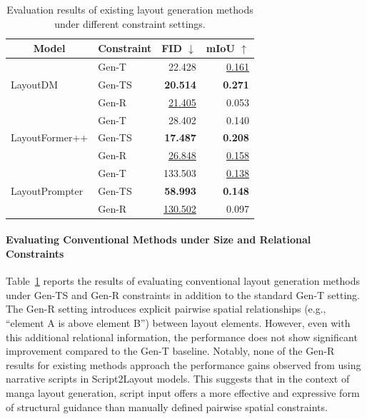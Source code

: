 \documentclass[sigconf, screen, review, anonymous]{acmart}
\begin{document}
\begin{table}[t]
\centering
\caption{
Evaluation results of existing layout generation methods under different constraint settings.
}
\begin{tabular}{l l r r}
\toprule
\multicolumn{1}{c}{Model} & \multicolumn{1}{c}{Constraint} & \multicolumn{1}{c}{FID $\downarrow$}& \multicolumn{1}{c}{mIoU $\uparrow$}\\
\midrule
\multirow{3}{*}{LayoutDM} 
    & Gen-T  &22.428 &  \underline{0.161} \\
    & Gen-TS & \textbf{20.514}    & \textbf{0.271} \\
    & Gen-R  &  \underline{21.405}             & 0.053 \\
\midrule
\multirow{3}{*}{LayoutFormer++} 
    & Gen-T  & 28.402             & 0.140 \\
    & Gen-TS & \textbf{17.487}    & \textbf{0.208} \\
    & Gen-R  & \underline{26.848} & \underline{0.158} \\
\midrule
\multirow{3}{*}{LayoutPrompter} 
    & Gen-T  & 133.503            & \underline{0.138} \\
    & Gen-TS & \textbf{58.993}    & \textbf{0.148} \\
    & Gen-R  & \underline{130.502}& 0.097 \\
\bottomrule
\end{tabular}
\label{tab:constraint_existing_method}
\end{table}

\paragraph{Evaluating Conventional Methods under Size and Relational Constraints}
Table~\ref{tab:constraint_existing_method} reports the results of evaluating conventional layout generation methods under Gen-TS and Gen-R constraints in addition to the standard Gen-T setting. The Gen-R setting introduces explicit pairwise spatial relationships (e.g., “element A is above element B”) between layout elements. However, even with this additional relational information, the performance does not show significant improvement compared to the Gen-T baseline. Notably, none of the Gen-R results for existing methods approach the performance gains observed from using narrative scripts in Script2Layout models. This suggests that in the context of manga layout generation, script input offers a more effective and expressive form of structural guidance than manually defined pairwise spatial constraints.
\end{document}
